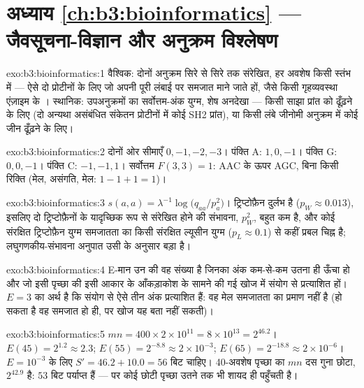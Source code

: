 \section*{अध्याय \ref{ch:b3:bioinformatics} --- जैवसूचना-विज्ञान और अनुक्रम विश्लेषण}

\begin{solution}{exo:b3:bioinformatics:1}
वैश्विक: दोनों अनुक्रम सिरे से सिरे तक संरेखित, हर अवशेष किसी स्तंभ में
--- ऐसे दो प्रोटीनों के लिए जो अपनी पूरी लंबाई पर समजात माने जाते हों,
जैसे किसी गृहव्यवस्था एंज़ाइम के । स्थानिक: उपअनुक्रमों का
सर्वोत्तम-अंक युग्म, शेष अनदेखा --- किसी साझा प्रांत को ढूँढ़ने के लिए
(दो अन्यथा असंबंधित संकेतन प्रोटीनों में कोई SH2 प्रांत), या किसी लंबे
जीनोमी अनुक्रम में कोई जीन ढूँढ़ने के लिए।
\end{solution}

\begin{solution}{exo:b3:bioinformatics:2}
दोनों ओर सीमाएँ $0,-1,-2,-3$। पंक्ति A: $1, 0, -1$। पंक्ति G: $0, 0, -1$।
पंक्ति C: $-1, -1, 1$। सर्वोत्तम $F(3,3) = 1$: AAC के ऊपर AGC, बिना
किसी रिक्ति (मेल, असंगति, मेल: $1 - 1 + 1 = 1$)।
\end{solution}

\begin{solution}{exo:b3:bioinformatics:3}
$s(a,a) = \lambda^{-1}\log\bigl(q_{aa}/p_{a}^{2}\bigr)$। ट्रिप्टोफ़ैन
दुर्लभ है ($p_{W} \approx 0.013$), इसलिए दो ट्रिप्टोफ़ैनों के यादृच्छिक
रूप से संरेखित होने की संभावना, $p_{W}^{2}$, बहुत कम है, और कोई
संरक्षित ट्रिप्टोफ़ैन युग्म समजातता का किसी संरक्षित ल्यूसीन युग्म ($p_{L}
\approx 0.1$) से कहीं प्रबल चिह्न है; लघुगणकीय-संभावना अनुपात उसी के
अनुसार बड़ा है।
\end{solution}

\begin{solution}{exo:b3:bioinformatics:4}
E-मान उन  की वह संख्या है जिनका अंक कम-से-कम उतना ही ऊँचा हो
और जो इसी पृच्छा की इसी आकार के आँकड़ाकोश के सामने की गई खोज में संयोग
से प्रत्याशित हों। $E = 3$ का अर्थ है कि संयोग से ऐसे तीन अंक प्रत्याशित
हैं: वह मेल समजातता का प्रमाण नहीं है (हो सकता है वह समजात हो ही, पर
खोज यह बता नहीं सकती)।
\end{solution}

\begin{solution}{exo:b3:bioinformatics:5}
$mn = 400\times 2\times 10^{11} = 8\times 10^{13} = 2^{46.2}$। $E(45) =
2^{1.2} \approx 2.3$; $E(55) = 2^{-8.8} \approx 2\times 10^{-3}$;
$E(65) = 2^{-18.8} \approx 2\times 10^{-6}$। $E = 10^{-3}$ के लिए $S' =
46.2 + 10.0 = 56$ बिट चाहिए। \num{40}-अवशेष पृच्छा का $mn$ दस गुना
छोटा, $2^{42.9}$ है: $53$ बिट पर्याप्त हैं --- पर कोई छोटी पृच्छा उतने
तक भी शायद ही पहुँचती है।
\end{solution}

